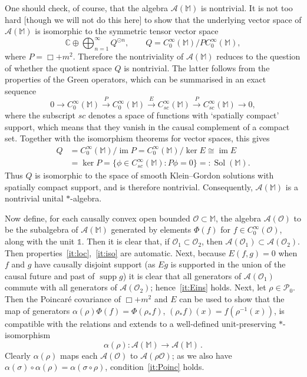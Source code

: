 \documentclass[12pt,a4paper]{article}
\newcommand{\1}{\mathds{1}}                         %
\newcommand{\CC}{\mathbb{C}}           %
\newcommand{\Ocal}{\mathcal{O}}
\newcommand{\MM}{\mathbb{M}}
\newcommand{\II}{{\mathbb{1}}}
\newcommand{\Ac}{{\mathcal{A}}}
\newcommand{\Pc}{{\mathcal{P}}}
\newcommand{\CoinX}[1]{C_0^\infty(#1)}
\DeclareMathOperator{\im}{im}
\DeclareMathOperator{\supp}{supp}
\DeclareMathOperator{\Sol}{Sol}
\begin{document}
	One should check, of course, that the algebra $\Ac(\MM)$ is nontrivial. It is not too hard [though we will not do this here] to show that the underlying vector space of $\Ac(\MM)$ is isomorphic to the symmetric tensor vector space
	\[
	\CC \oplus \bigoplus_{n=1}^\infty Q^{\odot n}, \qquad Q = \CoinX{\MM}/P \CoinX{\MM},
	\]
	where $P=\Box+m^2$. Therefore the nontriviality of $\Ac(\MM)$ reduces to the question of whether the quotient space $Q$ is nontrivial. 
	The latter follows from the properties of the Green operators, which can be summarised in an exact sequence~\cite{BarGinouxPfaffle}
	\begin{equation}\label{eq:exactsequence}
	0 \longrightarrow \CoinX{\MM}\stackrel{P}{\longrightarrow}  \CoinX{\MM} \stackrel{E}{\longrightarrow}
	C^\infty_{\textit{sc}} (\MM) \stackrel{P}{\longrightarrow}C^\infty_{\textit{sc}} (\MM) \longrightarrow 0,
	\end{equation} 
	where the subscript $sc$ denotes a space of functions with `spatially compact' support, which means that they vanish in the causal complement of a compact set. Together with the isomorphism theorems for vector spaces, this gives
	\begin{align}
	Q & = \CoinX{\MM}/\im P = \CoinX{\MM}/\ker E \cong \im E \nonumber \\
	& = \ker P =\{\phi\in C^\infty_{\textit{sc}} (\MM): P\phi=0\}=:\Sol(\MM).
	\end{align}
	Thus $Q$ is isomorphic to the space of smooth Klein--Gordon solutions with spatially compact support, and is therefore nontrivial. Consequently, $\Ac(\MM)$ is a nontrivial unital $*$-algebra.
	
	Now define, for each causally convex open bounded $\Ocal\subset\MM$, the algebra $\Ac(\Ocal)$ to be the subalgebra of $\Ac(\MM)$ generated by elements $\Phi(f)$ for $f\in\CoinX{\Ocal}$, along with the unit $\II$. 
	Then it is clear that, if $\Ocal_1\subset \Ocal_2$, then $\Ac(\Ocal_1)\subset \Ac(\Ocal_2)$. Then properties~\ref{it:loc},~\ref{it:iso} are automatic.
	Next, because $E(f,g)=0$ when $f$ and $g$ have causally disjoint support (as $Eg$ is supported in the union of the causal future and past of $\supp g$) it is clear that all generators of $\Ac(\Ocal_1)$ commute with all generators of $\Ac(\Ocal_2)$; hence~\ref{it:Eins} holds. Next, let $\rho\in\Pc_0$. Then the Poincar\'e covariance of $\Box+m^2$ and $E$ can be used to show that
	the map of generators $\alpha(\rho)\Phi(f) = \Phi(\rho_* f)$, $(\rho_*f)(x)=f(\rho^{-1}(x))$, is compatible with the relations and extends to a well-defined unit-preserving $*$-isomorphism
	\begin{equation}
	\alpha(\rho):\Ac(\MM)\to\Ac(\MM)\,.
	\end{equation}
	Clearly $\alpha(\rho)$ maps each $\Ac(\Ocal)$ to $\Ac(\rho\Ocal)$; as we also have $\alpha(\sigma)\circ\alpha(\rho)=\alpha(\sigma\circ\rho)$,  condition~\ref{it:Poinc} holds. 
	
\end{document}
